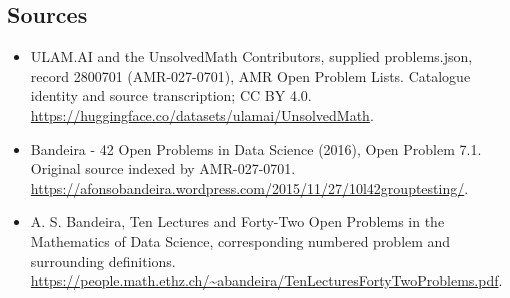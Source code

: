 \documentclass[11pt,a4paper]{article}
\begin{document}
\subsection{Sources}
\begin{itemize}
\item[S1] ULAM.AI and the UnsolvedMath Contributors, supplied problems.json, record 2800701 (AMR-027-0701), AMR Open Problem Lists. Catalogue identity and source transcription; CC BY 4.0.
\url{https://huggingface.co/datasets/ulamai/UnsolvedMath}.
\item[S2] Bandeira - 42 Open Problems in Data Science (2016), Open Problem 7.1. Original source indexed by AMR-027-0701.
\url{https://afonsobandeira.wordpress.com/2015/11/27/10l42grouptesting/}.
\item[S3] A. S. Bandeira, Ten Lectures and Forty-Two Open Problems in the Mathematics of Data Science, corresponding numbered problem and surrounding definitions.
\url{https://people.math.ethz.ch/~abandeira/TenLecturesFortyTwoProblems.pdf}.
\end{itemize}
\end{document}
